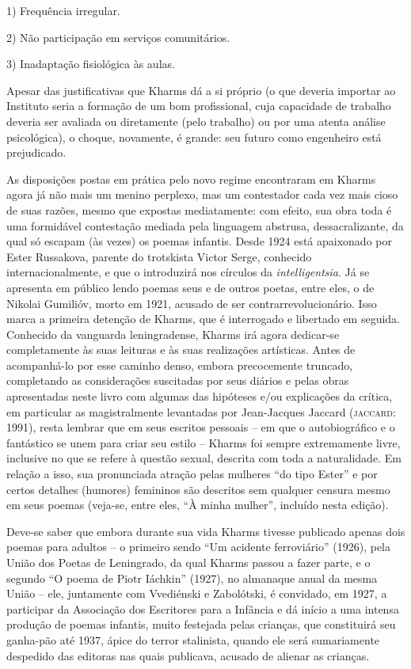 1) Frequência irregular.

2) Não participação em serviços comunitários.

3) Inadaptação fisiológica às aulas.

Apesar das justificativas que Kharms dá a si próprio (o que deveria
importar ao Instituto seria a formação de um bom profissional, cuja
capacidade de trabalho deveria ser avaliada ou diretamente (pelo
trabalho) ou por uma atenta análise psicológica), o choque, novamente, é
grande: seu futuro como engenheiro está prejudicado.

As disposições postas em prática pelo novo regime encontraram em Kharms
agora já não mais um menino perplexo, mas um contestador cada vez mais
cioso de suas razões, mesmo que expostas mediatamente: com efeito, sua
obra toda é uma formidável contestação mediada pela linguagem abstrusa,
dessacralizante, da qual só escapam (às vezes) os poemas infantis. Desde
1924 está apaixonado por Ester Russakova, parente do trotskista Victor
Serge, conhecido internacionalmente, e que o introduzirá nos círculos da
\emph{intelligentsia}. Já se apresenta em público lendo poemas seus e de
outros poetas, entre eles, o de Nikolai Gumilióv, morto em 1921, acusado
de ser contrarrevolucionário. Isso marca a primeira detenção de Kharms,
que é interrogado e libertado em seguida. Conhecido da vanguarda
leningradense, Kharms irá agora dedicar-se completamente às suas
leituras e às suas realizações artísticas. Antes de acompanhá-lo por
esse caminho denso, embora precocemente truncado, completando as
considerações suscitadas por seus diários e pelas obras apresentadas
neste livro com algumas das hipóteses e/ou explicações da crítica, em
particular as magistralmente levantadas por Jean-Jacques Jaccard
(\textsc{jaccard}: 1991), resta lembrar que em seus escritos pessoais --
em que o autobiográfico e o fantástico se unem para criar seu estilo --
Kharms foi sempre extremamente livre, inclusive no que se refere à
questão sexual, descrita com toda a naturalidade. Em relação a isso, sua
pronunciada atração pelas mulheres ``do tipo Ester'' e por certos
detalhes (humores) femininos são descritos sem qualquer censura mesmo em
seus poemas (veja-se, entre eles, ``À minha mulher'', incluído nesta
edição).

Deve-se saber que embora durante sua vida Kharms tivesse publicado
apenas dois poemas para adultos -- o primeiro sendo ``Um acidente
ferroviário'' (1926), pela União dos Poetas de Leningrado, da qual
Kharms passou a fazer parte, e o segundo ``O poema de Piotr Iáchkin''
(1927), no almanaque anual da mesma União -- ele, juntamente com
Vvediénski e Zabolótski, é convidado, em 1927, a participar da
Associação dos Escritores para a Infância e dá início a uma intensa
produção de poemas infantis, muito festejada pelas crianças, que
constituirá seu ganha-pão até 1937, ápice do terror stalinista, quando
ele será sumariamente despedido das editoras nas quais publicava,
acusado de alienar as crianças.

